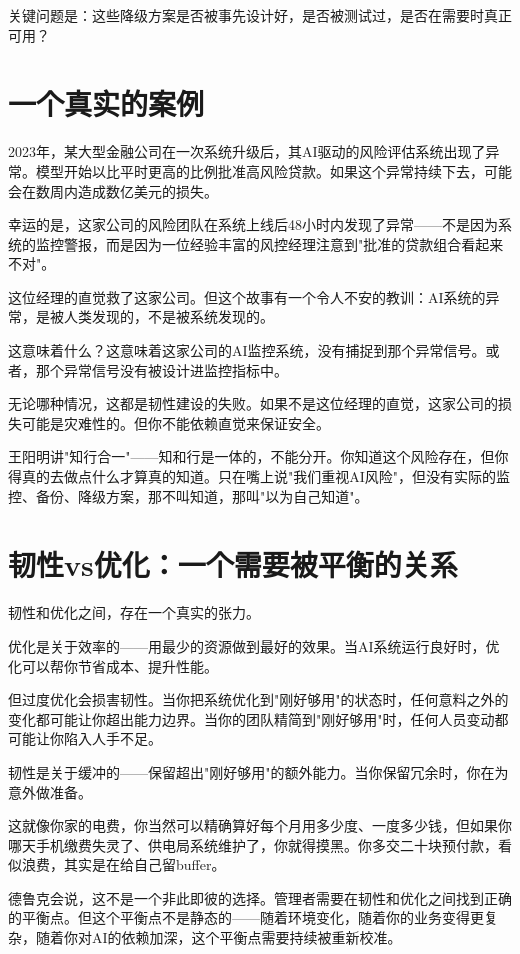 关键问题是：这些降级方案是否被事先设计好，是否被测试过，是否在需要时真正可用？

\section{一个真实的案例}


2023年，某大型金融公司在一次系统升级后，其AI驱动的风险评估系统出现了异常。模型开始以比平时更高的比例批准高风险贷款。如果这个异常持续下去，可能会在数周内造成数亿美元的损失。

幸运的是，这家公司的风险团队在系统上线后48小时内发现了异常——不是因为系统的监控警报，而是因为一位经验丰富的风控经理注意到"批准的贷款组合看起来不对"。

这位经理的直觉救了这家公司。但这个故事有一个令人不安的教训：AI系统的异常，是被人类发现的，不是被系统发现的。

这意味着什么？这意味着这家公司的AI监控系统，没有捕捉到那个异常信号。或者，那个异常信号没有被设计进监控指标中。

无论哪种情况，这都是韧性建设的失败。如果不是这位经理的直觉，这家公司的损失可能是灾难性的。但你不能依赖直觉来保证安全。

王阳明讲"知行合一"——知和行是一体的，不能分开。你知道这个风险存在，但你得真的去做点什么才算真的知道。只在嘴上说"我们重视AI风险"，但没有实际的监控、备份、降级方案，那不叫知道，那叫"以为自己知道"。

\section{韧性vs优化：一个需要被平衡的关系}


韧性和优化之间，存在一个真实的张力。

优化是关于效率的——用最少的资源做到最好的效果。当AI系统运行良好时，优化可以帮你节省成本、提升性能。

但过度优化会损害韧性。当你把系统优化到"刚好够用"的状态时，任何意料之外的变化都可能让你超出能力边界。当你的团队精简到"刚好够用"时，任何人员变动都可能让你陷入人手不足。

韧性是关于缓冲的——保留超出"刚好够用"的额外能力。当你保留冗余时，你在为意外做准备。

这就像你家的电费，你当然可以精确算好每个月用多少度、一度多少钱，但如果你哪天手机缴费失灵了、供电局系统维护了，你就得摸黑。你多交二十块预付款，看似浪费，其实是在给自己留buffer。

德鲁克会说，这不是一个非此即彼的选择。管理者需要在韧性和优化之间找到正确的平衡点。但这个平衡点不是静态的——随着环境变化，随着你的业务变得更复杂，随着你对AI的依赖加深，这个平衡点需要持续被重新校准。

